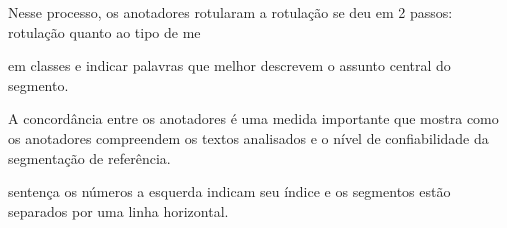 
Nesse processo, os anotadores rotularam
a rotulação se deu em 2 passos: rotulação quanto ao tipo de me

em classes e indicar palavras que melhor descrevem o assunto central do segmento.













A concordância entre os anotadores é uma medida importante que mostra como os anotadores compreendem os textos analisados e o nível de confiabilidade da segmentação de referência.







sentença os números a esquerda indicam seu índice e os segmentos estão separados por uma linha horizontal.








